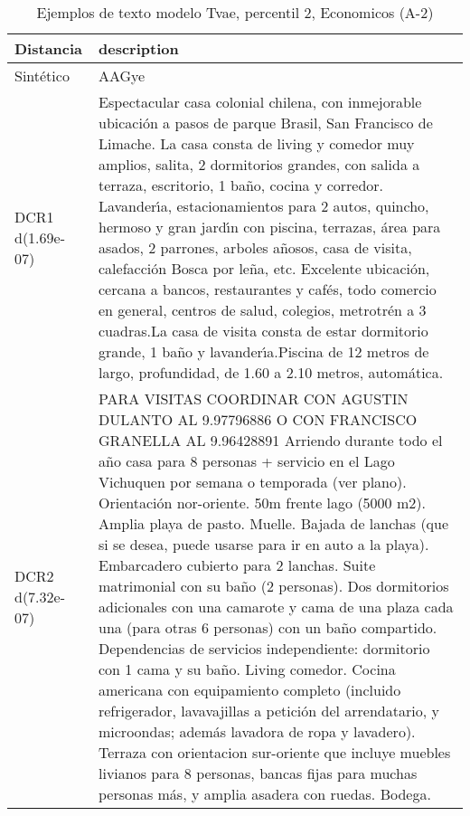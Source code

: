 \begin{table}[H]
\centering
\fontsize{10}{14}\selectfont
\caption{Ejemplos de texto modelo Tvae, percentil 2, Economicos (A-2)}
\label{table-example-economicos-a-2-tvae-2p-text}
\begin{tabular}{|l|m{35em}|}
\hline
\rowcolor[gray]{0.8}
Distancia & description \\
\hline Sintético & AAGye \\
\hline DCR1 d(1.69e-07) & Espectacular casa colonial chilena, con inmejorable ubicaci\'on a pasos de parque Brasil, San Francisco de Limache. La casa consta de living y comedor muy amplios, salita, 2 dormitorios grandes, con salida a terraza, escritorio, 1 ba\~no, cocina y corredor. Lavander{\'\i}a, estacionamientos para 2 autos, quincho, hermoso y gran jard{\'\i}n con piscina, terrazas, \'area para asados, 2 parrones, arboles a\~nosos, casa de visita, calefacci\'on Bosca por le\~na, etc. Excelente ubicaci\'on, cercana a bancos, restaurantes y caf\'es, todo comercio en general, centros de salud, colegios, metrotr\'en a 3 cuadras.La casa de visita consta de estar dormitorio grande, 1 ba\~no y lavander{\'\i}a.Piscina de 12 metros de largo, profundidad, de 1.60 a 2.10 metros, autom\'atica. \\
\hline DCR2 d(7.32e-07) & PARA VISITAS COORDINAR CON AGUSTIN DULANTO AL 9.97796886 O CON FRANCISCO GRANELLA AL 9.96428891  Arriendo durante todo el a\~no casa para 8 personas + servicio en el Lago Vichuquen por semana o temporada (ver plano). Orientaci\'on nor-oriente. 50m frente lago (5000 m2). Amplia playa de pasto. Muelle. Bajada de lanchas (que si se desea, puede usarse para ir en auto a la playa). Embarcadero cubierto para 2 lanchas. Suite matrimonial con su ba\~no (2 personas). Dos dormitorios adicionales con una camarote y cama de una plaza cada una (para otras 6 personas) con un ba\~no compartido. Dependencias de servicios independiente: dormitorio con 1 cama y su ba\~no. Living comedor. Cocina americana con equipamiento completo (incluido refrigerador, lavavajillas a petici\'on del arrendatario, y microondas; adem\'as lavadora de ropa y lavadero). Terraza con orientacion sur-oriente que incluye muebles livianos para 8 personas, bancas fijas para muchas personas m\'as, y amplia asadera con ruedas. Bodega. \\
\hline
\end{tabular}
\end{table}
